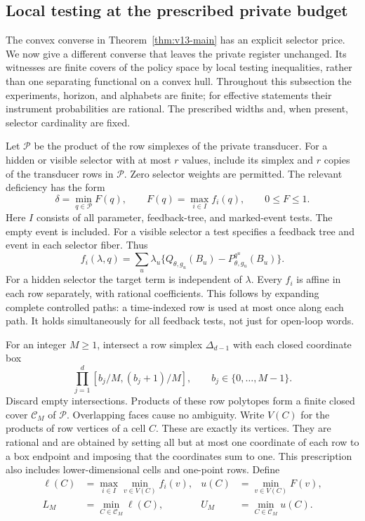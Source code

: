 \subsection{Local testing at the prescribed private budget}
\label{sec:v14-local}
The convex converse in Theorem~\ref{thm:v13-main} has an explicit selector
price. We now give a different converse that leaves the private register
unchanged. Its witnesses are finite covers of the policy space by local
testing inequalities, rather than one separating functional on a convex
hull. Throughout this subsection the experiments, horizon, and alphabets
are finite; for effective statements their instrument probabilities are
rational. The prescribed widths and, when present, selector cardinality
are fixed.

Let $\mathcal P$ be the product of the row simplexes of the private
transducer. For a hidden or visible selector with at most $r$ values,
include its simplex and $r$ copies of the transducer rows in $\mathcal P$.
Zero selector weights are permitted. The relevant deficiency has the form
\begin{equation}\label{eq:v14-objective}
 \delta=\min_{q\in\mathcal P}F(q),\qquad
 F(q)=\max_{i\in I}f_i(q),\qquad 0\le F\le1.
\end{equation}
Here $I$ consists of all parameter, feedback-tree, and marked-event tests.
The empty event is included. For a visible selector a test specifies a
feedback tree and event in each selector fiber. Thus
\[
 f_i(\lambda,q)=\sum_u\lambda_u
       \{Q_{\theta,g_u}(B_u)-P^{q^u}_{\theta,g_u}(B_u)\}.
\]
For a hidden selector the target term is independent of $\lambda$.
Every $f_i$ is affine in each row separately, with rational coefficients.
This follows by expanding complete controlled paths: a time-indexed row
is used at most once along each path. It holds simultaneously for all
feedback tests, not just for open-loop words.

For an integer $M\ge1$, intersect a row simplex $\Delta_{d-1}$ with each
closed coordinate box
\[
 \prod_{j=1}^d[b_j/M,(b_j+1)/M],\qquad b_j\in\{0,\ldots,M-1\}.
\]
Discard empty intersections. Products of these row polytopes form a
finite closed cover $\mathcal C_M$ of $\mathcal P$. Overlapping faces
cause no ambiguity. Write $V(C)$ for the products of row vertices of a
cell $C$. These are exactly its vertices. They are rational and are
obtained by setting all but at most one coordinate of each row to a box
endpoint and imposing that the coordinates sum to one. This prescription
also includes lower-dimensional cells and one-point rows.
Define
\begin{align}
 \ell(C)&=\max_{i\in I}\min_{v\in V(C)}f_i(v),&
 u(C)&=\min_{v\in V(C)}F(v),\label{eq:v14-cell}\\
 L_M&=\min_{C\in\mathcal C_M}\ell(C),&
 U_M&=\min_{C\in\mathcal C_M}u(C).\label{eq:v14-bounds}
\end{align}

